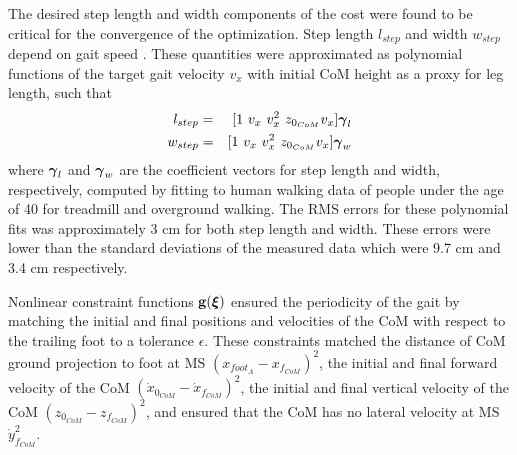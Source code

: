 The desired step length and width components of the cost were found to be critical for the convergence of the optimization. Step length $ l_{step} $ and width $ w_{step} $ depend on gait speed \cite{andriacchi1977walking}. These quantities were approximated as polynomial functions of the target gait velocity $ v_x $ with initial CoM height as a proxy for leg length, such that
\begin{eqnarray}
	l_{step} &=& [1\ v_x\ v_x^2\ z_{0_{CoM}} v_x] \boldsymbol{\gamma}_l \\
	w_{step} &=& [1\ v_x\ v_x^2\ z_{0_{CoM}} v_x] \boldsymbol{\gamma}_w
\end{eqnarray}
%
where $ \boldsymbol{\gamma}_l $ and $ \boldsymbol{\gamma}_w $ are the coefficient vectors for step length and width, respectively, computed by fitting to human walking data of people under the age of 40 for treadmill and overground walking. The RMS errors for these polynomial fits was approximately 3 cm for both step length and width. These errors were lower than the standard deviations of the measured data which were 9.7 cm and 3.4 cm respectively.
%

Nonlinear constraint functions $ \mathbf{g}(\boldsymbol{\xi}) $ ensured the periodicity of the gait by matching the initial and final positions and velocities of the CoM with respect to the trailing foot to a tolerance $ \epsilon $. These constraints matched the distance of CoM ground projection to foot at MS $ (x_{foot_A} - x_{f_{CoM}})^2  $, the initial and final forward velocity of the CoM $ (\dot{x}_{0_{CoM}} - \dot{x}_{f_{CoM}} )^2 $, the initial and final vertical velocity of the CoM $ (z_{0_{CoM}} - z_{f_{CoM}})^2 $, and ensured that the CoM has no lateral velocity at MS $ \dot{y}_{f_{CoM}}^2 $.
%	

